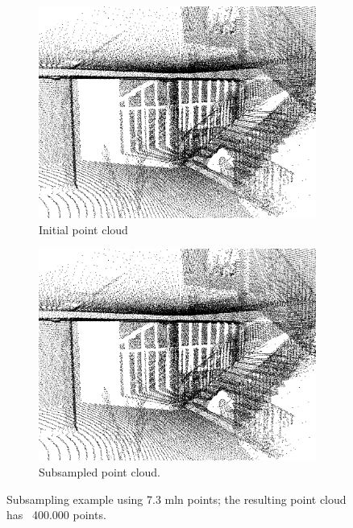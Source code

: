 \documentclass{article}
\begin{document}
\begin{figure} [h]
    \centering
    \begin{subfigure} [br]{0.45\textwidth}
         \centering
         \includegraphics[width=\textwidth]{ROB-15-0035_fig9a.png}
         \caption{Initial point cloud}
    \end{subfigure}
    \begin{subfigure} [bl]{0.45\textwidth}
         \centering
         \includegraphics[width=\textwidth]{ROB-15-0035_fig9a.png}
         \caption{Subsampled point cloud.}
    \end{subfigure}
    \caption{Subsampling example using 7.3 mln points; the resulting point cloud has ~400.000 points.}
    \label{fig:sparseresults}
\end{figure}
\end{document}
